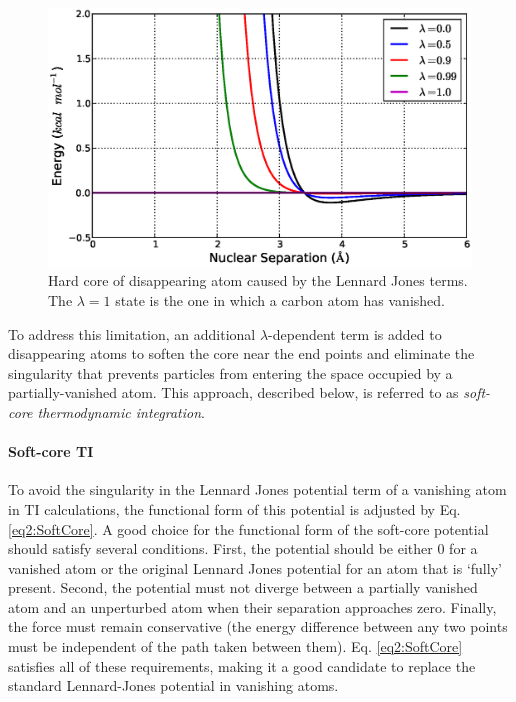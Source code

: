 \begin{figure}
   \includegraphics[width=6.5in]{HardCore.ps}
   \caption{Hard core of disappearing atom caused by the Lennard Jones terms.
            The $\lambda = 1$ state is the one in which a carbon atom has
            vanished.}
   \label{fig2:HardCore}
\end{figure}

To address this limitation, an additional $\lambda$-dependent term is added to
disappearing atoms to soften the core near the end points and eliminate the
singularity that prevents particles from entering the space occupied by a
partially-vanished atom. This approach, described below, is referred to as
\emph{soft-core thermodynamic integration}.

\paragraph{Soft-core TI}

To avoid the singularity in the Lennard Jones potential term of a vanishing atom
in TI calculations, the functional form of this potential is adjusted by Eq.
\ref{eq2:SoftCore}. A good choice for the functional form of the soft-core
potential should satisfy several conditions. First, the potential should be
either 0 for a vanished atom or the original Lennard Jones potential for an atom
that is `fully' present. Second, the potential must not diverge between a
partially vanished atom and an unperturbed atom when their separation approaches
zero.  Finally, the force must remain conservative (\ie the energy difference
between any two points must be independent of the path taken between them). Eq.
\ref{eq2:SoftCore} satisfies all of these requirements, making it a good
candidate to replace the standard Lennard-Jones potential in vanishing atoms.

